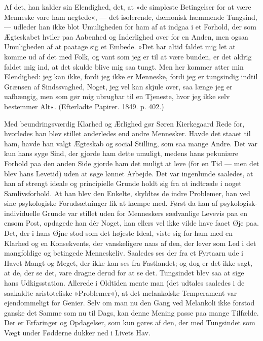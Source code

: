 \documentclass[12pt,a4paper,openany]{book}
\newcommand{\opage}[1]{\marginnote{\footnotesize\textit{[#1]}}}
\begin{document}
Af det, han kalder sin Elendighed, det, at »de
simpleste Betingelser for at være Menneske vare ham
negtede«, --- det isolerende, dæmonisk hæmmende Tungsind,
--- udleder han ikke blot Umuligheden for ham af
at indgaa i et Forhold, der som Ægteskabet hviler paa
Aabenhed og Inderlighed over for en Anden, men ogsaa
Umuligheden af at paatage sig et Embede. »Det har
\opage{39}altid faldet mig let at komme ud af det med Folk, og vant
som jeg er til at være bunden, er det aldrig faldet mig ind,
at det skulde blive mig saa tungt. Men her kommer atter
min Elendighed: jeg kan ikke, fordi jeg ikke er Menneske,
fordi jeg er tungsindig indtil Grænsen af Sindssvaghed,
Noget, jeg vel kan skjule over, saa længe jeg er uafhængig,
men som gør mig ubrugbar til en Tjeneste, hvor jeg ikke
selv bestemmer Alt«. (Efterladte Papirer. 1849. p. 402.)

Med beundringsværdig Klarhed og Ærlighed gør
Søren Kierkegaard Rede for, hvorledes han blev stillet
anderledes end andre Mennesker. Havde det staaet til
ham, havde han valgt Ægteskab og social Stilling, som
saa mange Andre. Det var kun hans syge Sind, der
gjorde ham dette umuligt, medens hans pekuniære Forhold
paa den anden Side gjorde ham det muligt at leve
(for en Tid --- men det blev hans Levetid) uden at søge
lønnet Arbejde. Det var ingenlunde saaledes, at han af
strengt ideale og principielle Grunde holdt sig fra at indtræde
i noget Samlivsforhold. At han blev den Enkelte,
skyldtes de indre Problemer, han ved sine psykologiske
Forudsætninger fik at kæmpe med. Først da han af
psykologisk-individuelle Grunde var stillet uden for
Menneskers sædvanlige Levevis paa en ensom Post, opdagede
han dér Noget, han ellers vel ikke vilde have
faaet Øje paa. Det, der i hans Øjne stod som det højeste
Ideal, viste sig for ham med en Klarhed og en Konsekvents,
der vanskeligere naas af den, der lever som
Led i det mangfoldige og betingede Menneskeliv. Saaledes
ses der fra et Fyrtaarn ude i Havet Mangt og
Meget, der ikke kan ses fra Fastlandet; og dog er det
ikke sagt, at de, der se det, vare dragne derud for at
se det. Tungsindet blev saa at sige hans Udkigsstation.
Allerede i Oldtiden mente man (det udtales saaledes i de
saakaldte aristoteliske »Problemer«), at det melankolske
\opage{40}Temperament var ejendommeligt for Genier. Selv om man
nu den Gang ved Melankoli ikke forstod ganske det
Samme som nu til Dags, kan denne Mening passe paa
mange Tilfælde. Der er Erfaringer og Opdagelser, som kun
gøres af den, der med Tungsindet som Vægt under Fødderne
dukker ned i Livets Hav.
\end{document}
